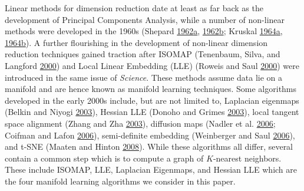 \documentclass[12pt]{article}
\begin{document}
Linear methods for dimension reduction date at least as far back as the development of Principal Components Analysis, while a number of non-linear methods were developed in the 1960s (Shepard \protect\hyperlink{ref-Shepard1962a}{1962}\protect\hyperlink{ref-Shepard1962a}{a}, \protect\hyperlink{ref-Shepard1962b}{1962}\protect\hyperlink{ref-Shepard1962b}{b}; Kruskal \protect\hyperlink{ref-Kruskal1964a}{1964}\protect\hyperlink{ref-Kruskal1964a}{a}, \protect\hyperlink{ref-Kruskal1964b}{1964}\protect\hyperlink{ref-Kruskal1964b}{b}). A further flourishing in the development of non-linear dimension reduction techniques gained traction after ISOMAP (Tenenbaum, Silva, and Langford \protect\hyperlink{ref-Tenenbaum2000-fr}{2000}) and Local Linear Embedding (LLE) (Roweis and Saul \protect\hyperlink{ref-Roweis2000-ni}{2000}) were introduced in the same issue of \emph{Science}. These methods assume data lie on a manifold and are hence known as manifold learning techniques. Some algorithms developed in the early 2000s include, but are not limited to, Laplacian eigenmaps (Belkin and Niyogi \protect\hyperlink{ref-Belkin2003}{2003}), Hessian LLE (Donoho and Grimes \protect\hyperlink{ref-Donoho2003-am}{2003}), local tangent space alignment (Zhang and Zha \protect\hyperlink{ref-Zhang2003-yi}{2003}), diffusion maps (Nadler et al. \protect\hyperlink{ref-Nadler2006-cm}{2006}; Coifman and Lafon \protect\hyperlink{ref-Coifman2006-no}{2006}), semi-definite embedding (Weinberger and Saul \protect\hyperlink{ref-Weinberger2006-dc}{2006}), and t-SNE (Maaten and Hinton \protect\hyperlink{ref-Maaten2008-dw}{2008}). While these algorithms all differ, several contain a common step which is to compute a graph of \(K\)-nearest neighbors. These include ISOMAP, LLE, Laplacian Eigenmaps, and Hessian LLE which are the four manifold learning algorithms we consider in this paper.
\end{document}
